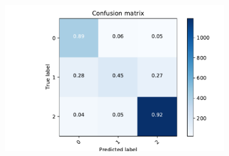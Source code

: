 \documentclass[aspectratio=1610, 9pt]{beamer}
\begin{document}
\begin{frame}
\begin{figure}
\begin{minipage}{\textwidth}
\begin{minipage}{0.46\textwidth}
    \end{minipage}
    \begin{minipage}{0.46\textwidth}
      \includegraphics[width=0.85\textwidth]{images/conf.pdf}
    \end{minipage}
  \end{minipage}
  \end{figure}
\end{frame}
\end{document}
